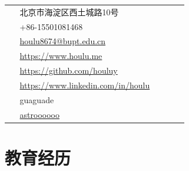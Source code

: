 \documentclass[10pt]{article} %
\makeatletter
\newcommand{\email}{houlu8674@bupt.edu.cn}
\newcommand{\website}{https://www.houlu.me}
\newcommand{\github}{https://github.com/houluy}
\newcommand{\linkedin}{https://www.linkedin.com/in/houlu}
\newcommand{\wechat}{guaguade}
\newcommand{\weibosite}{http://weibo.com/lucima}
\newcommand{\weibo}{astroooooo}
\makeatother
\begin{document}
\begin{paracol}{2}
	\parbox[top][0.12\textheight][c]{\linewidth}{ %
		\vspace{-0.04\textheight} %
		\colorbox{shade}{ %
			\begin{supertabular}{p{0.05\linewidth}|p{0.775\linewidth}} %
				\raisebox{-1pt}{\faHome} & 北京市海淀区西土城路10号 \\ %
				\raisebox{-1pt}{\faPhone} & +86-15501081468 \\ %
				\raisebox{0pt}{\small\faEnvelope} & \href{mailto:\email}{\email} \\ %
				\raisebox{-1pt}{\small\faDesktop} & \href{\website}{\website} \\ %
				\raisebox{-1pt}{\faGithub} & \href{\github}{\github} \\ %
				\raisebox{-1pt}{\faLinkedinSquare} & \href{\linkedin}{\linkedin} \\ %
				\raisebox{-1pt}{\faWechat} &
				\wechat \\
				\raisebox{-1pt}{\faWeibo} &
				\href{\weibosite}{\weibo} \\
			\end{supertabular}
		}
	}
	
	
	\section{教育经历} 
	
	
	
	
	
	\begin{supertabular}{rl} %
		

\end{supertabular}
\end{paracol}
\end{document}
